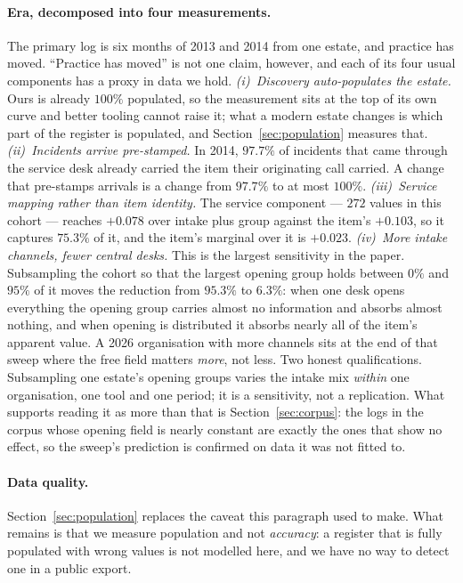 \documentclass[preprint,12pt]{elsarticle}
\begin{document}
\paragraph{Era, decomposed into four measurements.}
The primary log is six months of 2013 and 2014 from one estate, and practice
has moved. ``Practice has moved'' is not one claim, however, and each of its
four usual components has a proxy in data we hold.
\emph{(i)~Discovery auto-populates the estate.} Ours is already $100\%$
populated, so the measurement sits at the top of its own curve and better
tooling cannot raise it; what a modern estate changes is which part of the
register is populated, and Section~\ref{sec:population} measures that.
\emph{(ii)~Incidents arrive pre-stamped.} In 2014, $97.7\%$ of incidents that
came through the service desk already carried the item their originating call
carried. A change that pre-stamps arrivals is a change from $97.7\%$ to at
most $100\%$.
\emph{(iii)~Service mapping rather than item identity.} The service component
--- $272$ values in this cohort --- reaches $+0.078$ over intake plus group
against the item's $+0.103$, so it captures $75.3\%$ of it, and the item's
marginal over it is $+0.023$.
\emph{(iv)~More intake channels, fewer central desks.} This is the largest
sensitivity in the paper. Subsampling the cohort so that the largest opening
group holds between $0\%$ and $95\%$ of it moves the reduction from $95.3\%$
to $6.3\%$: when one desk opens everything the opening group carries almost no
information and absorbs almost nothing, and when opening is distributed it
absorbs nearly all of the item's apparent value. A 2026 organisation with more
channels sits at the end of that sweep where the free field matters
\emph{more}, not less. Two honest qualifications. Subsampling one estate's
opening groups varies the intake mix \emph{within} one organisation, one tool
and one period; it is a sensitivity, not a replication. What supports reading
it as more than that is Section~\ref{sec:corpus}: the logs in the corpus whose
opening field is nearly constant are exactly the ones that show no effect, so
the sweep's prediction is confirmed on data it was not fitted to.

\paragraph{Data quality.}
Section~\ref{sec:population} replaces the caveat this paragraph used to make.
What remains is that we measure population and not \emph{accuracy}: a register
that is fully populated with wrong values is not modelled here, and we have no
way to detect one in a public export.
\end{document}
